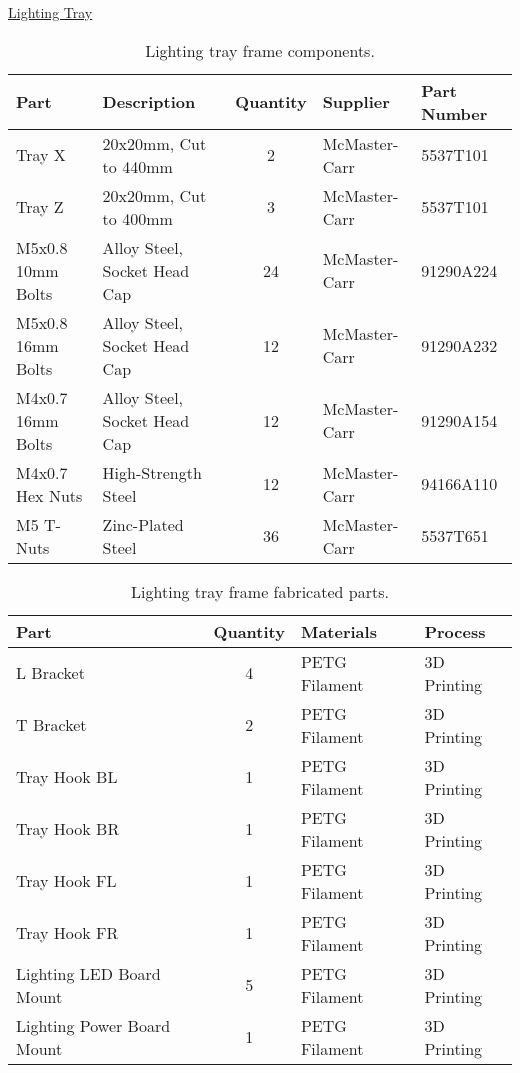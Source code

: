 \uline{Lighting Tray}
\begin{table}[!ht]
    \centering
    \begin{tabular}{|l|l|c|l|l|}
    \hline
        Part                & Description                   & Quantity  & Supplier          & Part Number   \\ \hline
        Tray X              & 20x20mm, Cut to 440mm         & 2         & McMaster-Carr     & 5537T101      \\ \hline
        Tray Z              & 20x20mm, Cut to 400mm         & 3         & McMaster-Carr     & 5537T101      \\ \hline
        M5x0.8 10mm Bolts   & Alloy Steel, Socket Head Cap  & 24        & McMaster-Carr     & 91290A224     \\ \hline
        M5x0.8 16mm Bolts   & Alloy Steel, Socket Head Cap  & 12        & McMaster-Carr     & 91290A232     \\ \hline
        M4x0.7 16mm Bolts   & Alloy Steel, Socket Head Cap  & 12        & McMaster-Carr     & 91290A154     \\ \hline
        M4x0.7 Hex Nuts     & High-Strength Steel           & 12        & McMaster-Carr     & 94166A110     \\ \hline
        M5 T-Nuts           & Zinc-Plated Steel             & 36        & McMaster-Carr     & 5537T651      \\ \hline
    \end{tabular}
    \caption{Lighting tray frame components.}
    \label{tab:housing_lightingtray_parts}
\end{table}

\begin{table}[!ht]
    \centering
    \begin{tabular}{|l|c|l|l|}
    \hline
        Part                        & Quantity  & Materials             & Process           \\ \hline
        L Bracket                   & 4         & PETG Filament         & 3D Printing       \\ \hline
        T Bracket                   & 2         & PETG Filament         & 3D Printing       \\ \hline
        Tray Hook BL                & 1         & PETG Filament         & 3D Printing       \\ \hline
        Tray Hook BR                & 1         & PETG Filament         & 3D Printing       \\ \hline
        Tray Hook FL                & 1         & PETG Filament         & 3D Printing       \\ \hline
        Tray Hook FR                & 1         & PETG Filament         & 3D Printing       \\ \hline
        Lighting LED Board Mount    & 5         & PETG Filament         & 3D Printing       \\ \hline
        Lighting Power Board Mount  & 1         & PETG Filament         & 3D Printing       \\ \hline
    \end{tabular}
    \caption{Lighting tray frame fabricated parts.}
    \label{tab:housing_lightingtray_fabrication}
\end{table}

